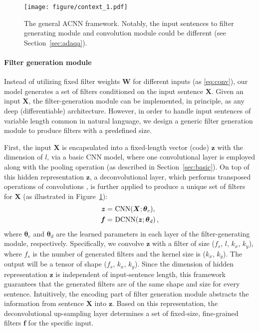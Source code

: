 \documentclass[11pt,a4paper]{article}
\begin{document}
\begin{figure}
\centering
	\texttt{[image: figure/context\_1.pdf]}
	\vspace{-3mm}
	\caption{\small The general ACNN framework. Notably, the input sentences to filter generating module and convolution module could be different (see Section~\ref{sec:adaqa}).}
	\label{fig:acnn}
	\vspace{-5mm}
\end{figure}

\paragraph{Filter generation module}
Instead of utilizing fixed filter weights $\boldsymbol{W}$ for different inputs (as \eqref{eq:conv}), our model generates a set of filters conditioned on the input sentence $\boldsymbol{X}$. Given an input $\boldsymbol{X}$, the filter-generation module can be implemented, in principle, as any deep (differentiable) architecture. However, in order to handle input sentences of variable length common in natural language, we design a generic filter generation module to produce filters with a predefined size.


First, the input $\boldsymbol{X}$ is encapsulated into a fixed-length vector (code) $\boldsymbol{z}$ with the dimension of $l$, via a basic CNN model, where one convolutional layer is employed along with the pooling operation (as described in Section~\ref{sec:basic}). On top of this hidden representation $\boldsymbol{z}$, a deconvolutional layer, which performs transposed operations of convolutions \cite{radford2015unsupervised}, is further applied to produce a unique set of filters for $\boldsymbol{X}$ (as illustrated in Figure~\ref{fig:acnn}):
\begin{align}
\boldsymbol{z} = & \ \textbf{\normalfont{CNN}}(\boldsymbol{X};  \boldsymbol{\theta}_e),
\label{eq:filter_cnn} \\
\boldsymbol{f} = & \ \textbf{\normalfont{DCNN}}(\boldsymbol{z};  \boldsymbol{\theta}_d) \,, \label{eq:filter_tc}
\end{align}
where $\boldsymbol{\theta}_e$ and $\boldsymbol{\theta}_d$ are the learned parameters in each layer of the filter-generating module, respectively. Specifically, we convolve $\boldsymbol{z}$ with a filter of size ($f_s$, $l$, $k_x$, $k_y$), where $f_s$ is the number of generated filters and the kernel size is ($k_x$, ${k_y}$). The output will be a tensor of shape (${f_s}$, ${k_x}$, ${k_y}$). Since the dimension of hidden representation $\boldsymbol{z}$ is independent of input-sentence length, this framework guarantees that the generated filters are of the same shape and size for every sentence.
Intuitively, the encoding part of filter generation module abstracts the information from sentence $\boldsymbol{X}$ into $\boldsymbol{z}$. Based on this representation, the deconvolutional up-sampling layer determines a set of fixed-size, fine-grained filters $\boldsymbol{f}$ for the specific input.
\end{document}
